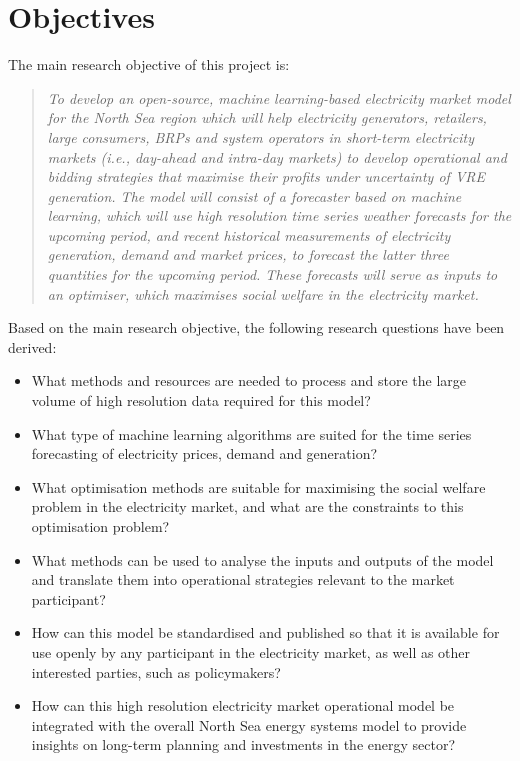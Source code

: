 \hypertarget{objectives}{%
\section{Objectives}\label{objectives}}

The main research objective of this project is:

\begin{quote}
\emph{To develop an open-source, machine learning-based electricity
market model for the North Sea region which will help electricity
generators, retailers, large consumers, BRPs and system operators in
short-term electricity markets (i.e., day-ahead and intra-day markets)
to develop operational and bidding strategies that maximise their
profits under uncertainty of VRE generation. The model will consist of a
forecaster based on machine learning, which will use high resolution
time series weather forecasts for the upcoming period, and recent
historical measurements of electricity generation, demand and market
prices, to forecast the latter three quantities for the upcoming period.
These forecasts will serve as inputs to an optimiser, which maximises
social welfare in the electricity market.}
\end{quote}

Based on the main research objective, the following research questions
have been derived:

\begin{itemize}
\tightlist
\item
  What methods and resources are needed to process and store the large
  volume of high resolution data required for this model?
\item
  What type of machine learning algorithms are suited for the time
  series forecasting of electricity prices, demand and generation?
\item
  What optimisation methods are suitable for maximising the social
  welfare problem in the electricity market, and what are the
  constraints to this optimisation problem?
\item
  What methods can be used to analyse the inputs and outputs of the
  model and translate them into operational strategies relevant to the
  market participant?
\item
  How can this model be standardised and published so that it is
  available for use openly by any participant in the electricity market,
  as well as other interested parties, such as policymakers?
\item
  How can this high resolution electricity market operational model be
  integrated with the overall North Sea energy systems model to provide
  insights on long-term planning and investments in the energy sector?
\end{itemize}
